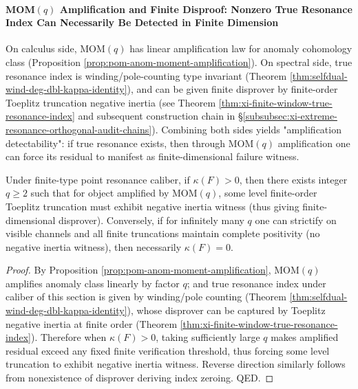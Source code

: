 \paragraph{MOM\texorpdfstring{$(q)$}{(q)} Amplification and Finite Disproof: Nonzero True Resonance Index Can Necessarily Be Detected in Finite Dimension}
On calculus side, MOM\((q)\) has linear amplification law for anomaly cohomology class (Proposition \ref{prop:pom-anom-moment-amplification}).
On spectral side, true resonance index is winding/pole-counting type invariant (Theorem \ref{thm:selfdual-wind-deg-dbl-kappa-identity}), and can be given finite disprover by finite-order Toeplitz truncation negative inertia (see Theorem \ref{thm:xi-finite-window-true-resonance-index} and subsequent construction chain in \S\ref{subsubsec:xi-extreme-resonance-orthogonal-audit-chains}).
Combining both sides yields "amplification detectability": if true resonance exists, then through MOM\((q)\) amplification one can force its residual to manifest as finite-dimensional failure witness.

\begin{theorem}[Amplification Detectability: True Resonance \texorpdfstring{$\Rightarrow$}{=>} Finite-Dimensional Disprover]\label{thm:xi-mom-amplify-detect-true-resonance}
Under finite-type point resonance caliber, if \(\kappa(F)>0\), then there exists integer \(q\ge 2\) such that for object amplified by MOM\((q)\), some level finite-order Toeplitz truncation must exhibit negative inertia witness (thus giving finite-dimensional disprover).
Conversely, if for infinitely many \(q\) one can strictify on visible channels and all finite truncations maintain complete positivity (no negative inertia witness), then necessarily \(\kappa(F)=0\).
\end{theorem}

\begin{proof}
By Proposition \ref{prop:pom-anom-moment-amplification}, MOM\((q)\) amplifies anomaly class linearly by factor \(q\); and true resonance index under caliber of this section is given by winding/pole counting (Theorem \ref{thm:selfdual-wind-deg-dbl-kappa-identity}), whose disprover can be captured by Toeplitz negative inertia at finite order (Theorem \ref{thm:xi-finite-window-true-resonance-index}).
Therefore when \(\kappa(F)>0\), taking sufficiently large \(q\) makes amplified residual exceed any fixed finite verification threshold, thus forcing some level truncation to exhibit negative inertia witness.
Reverse direction similarly follows from nonexistence of disprover deriving index zeroing. QED.
\end{proof}

\endinput
